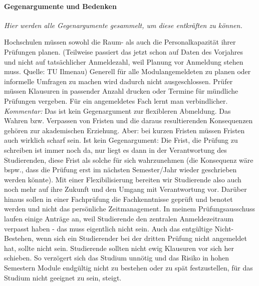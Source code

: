       \paragraph{Gegenargumente und Bedenken}
        \textit{Hier werden alle Gegenargumente gesammelt, um diese entkräften zu können.} \\
        \begin{outline}
          \1 Hochschulen müssen sowohl die Raum- als auch die Personalkapazität ihrer Prüfungen planen. (Teilweise passiert das jetzt schon auf Daten des Vorjahres und nicht auf tatsächlicher Anmeldezahl, weil Planung vor Anmeldung stehen muss. Quelle: TU Ilmenau)
            \2 Generell für alle Modulangemeldeten zu planen oder informelle Umfragen zu machen wird dadurch nicht ausgeschlossen.
          \1 Prüfer müssen Klausuren in passender Anzahl drucken oder Termine für mündliche Prüfungen vergeben.
          \1 Für ein angemeldetes Fach lernt man verbindlicher. \textit{Kommentar:} Das ist kein Gegenargument zur flexibleren Abmeldung.
          \1 Das Wahren bzw. Verpassen von Fristen und die daraus resultierenden Konsequenzen gehören zur akademischen Erziehung. Aber: bei kurzen Fristen müssen Fristen auch wirklich scharf sein.
            \2 Ist kein Gegenargument: Die Frist, die Prüfung zu schreiben ist immer noch da, nur liegt es dann in der Verantwortung des Studierenden, diese Frist als solche für sich wahrzunehmen (die Konsequenz wäre bspw., dass die Prüfung erst im nächsten Semester/Jahr wieder geschrieben werden könnte). Mit einer Flexibilisierung bereiten wir Studierende also auch noch mehr auf ihre Zukunft und den Umgang mit Verantwortung vor. Darüber hinaus sollen in einer Fachprüfung die Fachkenntnisse geprüft und benotet werden und nicht das persönliche Zeitmanagement.
            \2 In meinem Prüfungsausschuss laufen einige Anträge an, weil Studierende den zentralen Anmeldezeitraum verpasst haben - das muss eigentlich nicht sein. Auch das entgültige Nicht-Bestehen, wenn sich ein Studierender bei der dritten Prüfung nicht angemeldet hat, sollte nicht sein.
          \1 Studierende sollten nicht ewig Klausuren vor sich her schieben. So verzögert sich das Studium unnötig und das Risiko in hohen Semestern Module endgültig nicht zu bestehen oder zu spät festzustellen, für das Studium nicht geeignet zu sein, steigt.
        \end{outline}

